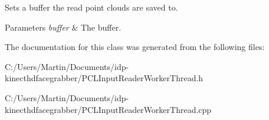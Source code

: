 Sets a buffer the read point clouds are saved to. 


\begin{DoxyParams}{Parameters}
{\em buffer} & The buffer. \\
\hline
\end{DoxyParams}


The documentation for this class was generated from the following files\+:\begin{DoxyCompactItemize}
\item 
C\+:/\+Users/\+Martin/\+Documents/idp-\/kinecthdfacegrabber/P\+C\+L\+Input\+Reader\+Worker\+Thread.\+h\item 
C\+:/\+Users/\+Martin/\+Documents/idp-\/kinecthdfacegrabber/P\+C\+L\+Input\+Reader\+Worker\+Thread.\+cpp\end{DoxyCompactItemize}
